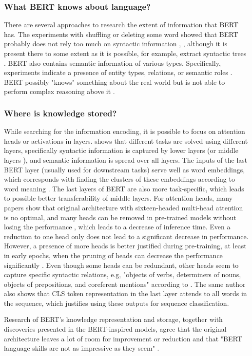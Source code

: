 \subsubsection{What BERT knows about language?}
There are several approaches to research the extent of information that BERT has. The experiments with shuffling or deleting some word showed that BERT probably does not rely too much on syntactic information \citep{Ettinger2019}, \citep{Rogers2020}, although it is present there to some extent as it is possible, for example, extract syntactic trees \citep{Rosa2019}. BERT also contains semantic information of various types. Specifically, experiments indicate a presence of entity types, relations, or semantic roles \citep{Tenney2019a}. BERT possibly "knows" something about the real world but is not able to perform complex reasoning above it \citep{Rogers2020}.

\subsubsection{Where is knowledge stored?}
While searching for the information encoding, it is possible to focus on attention heads or activations in layers.
\citep{Tenney2019} shows that different tasks are solved using different layers, specifically syntactic information is captured by lower layers (or middle layers \citep{Rogers2020}), and semantic information is spread over all layers. The inputs of the last BERT layer (usually used for downstream tasks) serve well as word embeddings, which corresponds with finding the clusters of these embeddings according to word meaning \citep{Rogers2020}. The last layers of BERT are also more task-specific, which leads to possible better transferability of middle layers. For attention heads, many papers show that original architecture with sixteen-headed multi-head attention is no optimal, and many heads can be removed in pre-trained models without losing the performance \citep{Michel2019}, which leads to a decrease of inference time. Even a reduction to one head only does not lead to a significant decrease in performance. However, a presence of more heads is better justified during pre-training, at least in early epochs, when the pruning of heads can decrease the performance significantly \citep{Michel2019}. Even though some heads can be redundant, other heads seem to capture specific syntactic relations, e.g, "objects of verbs, determiners of nouns, objects of prepositions, and coreferent mentions" according to \citep{Clark2019}. The same author also shows that CLS token representation in the last layer attends to all words in the sequence, which justifies using these outputs for sequence classification. 
\par
Research of BERT's knowledge representation and storage, together with discoveries presented in the BERT-inspired models, agree that the original architecture leaves a lot of room for improvement or reduction and that "BERT language skills are not as impressive as they seem" \citep{Rogers2020}.

